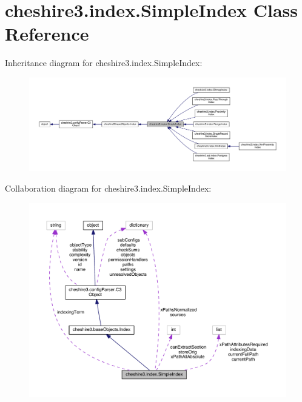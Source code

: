 \hypertarget{classcheshire3_1_1index_1_1_simple_index}{\section{cheshire3.\-index.\-Simple\-Index Class Reference}
\label{classcheshire3_1_1index_1_1_simple_index}
}


Inheritance diagram for cheshire3.\-index.\-Simple\-Index\-:
\nopagebreak
\begin{figure}[H]
\begin{center}
\leavevmode
\includegraphics[width=350pt]{classcheshire3_1_1index_1_1_simple_index__inherit__graph}
\end{center}
\end{figure}


Collaboration diagram for cheshire3.\-index.\-Simple\-Index\-:
\nopagebreak
\begin{figure}[H]
\begin{center}
\leavevmode
\includegraphics[width=350pt]{classcheshire3_1_1index_1_1_simple_index__coll__graph}
\end{center}
\end{figure}
